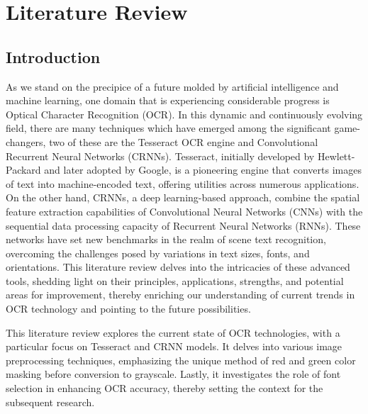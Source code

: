 \chapter{Literature Review}
\label{chap:litreview}


\section{Introduction}



As we stand on the precipice of a future molded by artificial intelligence and machine learning, one domain that is experiencing considerable progress is Optical Character Recognition (OCR). In this dynamic and continuously evolving field, there are many techniques which have emerged among the significant game-changers, two of these are the Tesseract OCR engine and Convolutional Recurrent Neural Networks (CRNNs). Tesseract, initially developed by Hewlett-Packard and later adopted by Google, is a pioneering engine that converts images of text into machine-encoded text, offering utilities across numerous applications. On the other hand, CRNNs, a deep learning-based approach, combine the spatial feature extraction capabilities of Convolutional Neural Networks (CNNs) with the sequential data processing capacity of Recurrent Neural Networks (RNNs). These networks have set new benchmarks in the realm of scene text recognition, overcoming the challenges posed by variations in text sizes, fonts, and orientations. This literature review delves into the intricacies of these advanced tools, shedding light on their principles, applications, strengths, and potential areas for improvement, thereby enriching our understanding of current trends in OCR technology and pointing to the future possibilities.



This literature review explores the current state of OCR technologies, with a particular focus on Tesseract and CRNN models. It delves into various image preprocessing techniques, emphasizing the unique method of red and green color masking before conversion to grayscale. Lastly, it investigates the role of font selection in enhancing OCR accuracy, thereby setting the context for the subsequent research.

